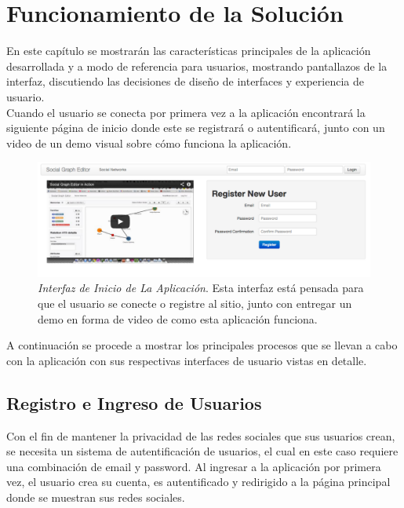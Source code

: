 \chapter{Funcionamiento de la Solución}
\label{chap:funcionamiento_solucion}

En este capítulo se mostrarán las características principales de la aplicación desarrollada y a modo de referencia para usuarios, mostrando pantallazos de la interfaz, discutiendo las decisiones de diseño de interfaces y experiencia de usuario.\\

Cuando el usuario se conecta por primera vez a la aplicación encontrará la siguiente página de inicio donde este se registrará o autentificará, junto con un video de un demo visual sobre cómo funciona la aplicación.

\begin{figure}[H]
  \centering
  \includegraphics[width=1.0\textwidth]{images/inicio.png}
  \caption[Interfaz de Inicio de La Aplicación]{\emph{Interfaz de Inicio de La Aplicación}. Esta interfaz está pensada para que el usuario se conecte o registre al sitio, junto con entregar un demo en forma de video de como esta aplicación funciona.}
  \label{inicio}
\end{figure}

A continuación se procede a mostrar los principales procesos que se llevan a cabo con la aplicación con sus respectivas interfaces de usuario vistas en detalle.

\section{Registro e Ingreso de Usuarios} %
\label{sec:registro_e_ingreso_de_usuarios}

Con el fin de mantener la privacidad de las redes sociales que sus usuarios crean, se necesita un sistema de autentificación de usuarios, el cual en este caso requiere una combinación de email y password. Al ingresar a la aplicación por primera vez, el usuario crea su cuenta, es autentificado y redirigido a la página principal donde se muestran sus redes sociales.

